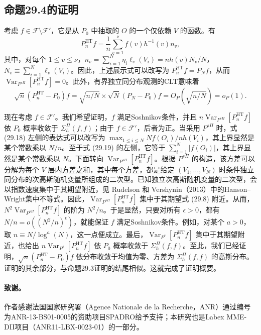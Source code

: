 \subsection{命题29.4的证明}

考虑 $f\in\mathcal F\setminus\mathcal F'$，它是从 $P_0$ 中抽取的 $O$ 的一个仅依赖 $V$ 的函数。有
\[
P_n^{\mathrm{HT}}f=\frac1n\sum_{v=1}^\nu f(v)h^{-1}(v)n_v,
\]
其中，对每个 $1\le v\le\nu$，$n_v=\sum_{i=1}^N\eta_i\ell_v(V_i)=nh(v)N_v/N$，$N_v\equiv\sum_{i=1}^N\ell_v(V_i)$。因此，上述展示式可以改写为 $P_n^{\mathrm{HT}}f=P_Nf$，从而 $\operatorname{Var}_{P^{s\Pi}}[P_n^{\mathrm{HT}}f]=0$。此外，有界独立同分布观测的CLT意味着
\[
\sqrt n(P_n^{\mathrm{HT}}-P_0)f
=\sqrt{n/N}\times\sqrt N(P_N-P_0)f
=O_P(\sqrt{n/N})=o_P(1).
\]

现在考虑 $f\in\mathcal F'$。我们希望证明，$f$ 满足Soshnikov条件，并且 $n\operatorname{Var}_{P^{s\Pi}}[P_n^{\mathrm{HT}}f]$ 依 $P_0$ 概率收敛于 $\Sigma_h^\Pi(f,f)$；由于 $f\in\mathcal F'$，后者为正。当采用 $P^{s\Pi}$ 时，式 (29.18) 左侧的表达式可以改写为 $\max_{1\le i\le N}Nf(O_i)/nh(V_i)$，其上界显然是某个常数乘以 $N/n$。至于式 (29.19) 的左侧，它等于 $\sum_{i=1}^N|f(O_i)|$，其上界显然是某个常数乘以 $N$。下面转向 $\operatorname{Var}_{P^{s\Pi}}[P_n^{\mathrm{HT}}f]$。根据 $P^{s\Pi}$ 的构造，该方差可以分解为每个 $V$ 层内方差之和，其中每个方差，都是给定 $(V_1,\ldots,V_N)$ 时条件独立同分布的次高斯随机变量所组成的二次型。已知独立次高斯随机变量的二次型，会以指数速度集中于其期望附近，见 Rudelson 和 Vershynin（2013）中的Hanson--Wright集中不等式。因此，$\operatorname{Var}_{P^{s\Pi}}[P_n^{\mathrm{HT}}f]$ 集中于其期望式 (29.8) 附近。从而，$N^2\operatorname{Var}_{P^{s\Pi}}[P_n^{\mathrm{HT}}f]$ 的阶为 $N^2/n$。于是显然，只要对所有 $\epsilon>0$，都有 $N/n=o((N^2/n)^\epsilon)$，就能保证 $f$ 满足Soshnikov条件。例如，对某个 $a>0$，取 $n\equiv N/\log^a(N)$，这一点便成立。最后，$\operatorname{Var}_{P^s}[P_n^{\mathrm{HT}}f]$ 集中于其期望附近，也给出 $n\operatorname{Var}_{P^s}[P_n^{\mathrm{HT}}f]$ 依 $P_0$ 概率收敛于 $\Sigma_h^\Pi(f,f)$。至此，我们已经证明，$\sqrt n(P_n^{\mathrm{HT}}-P_0)f$ 依分布收敛于均值为零、方差为 $\Sigma_h^\Pi(f,f)$ 的高斯分布。证明的其余部分，与命题29.3证明的结尾相似。这就完成了证明概要。

\paragraph{致谢。}
作者感谢法国国家研究署（Agence Nationale de la Recherche，ANR）通过编号为ANR-13-BS01-0005的资助项目SPADRO给予支持；本研究也是Labex MME-DII项目（ANR11-LBX-0023-01）的一部分。
